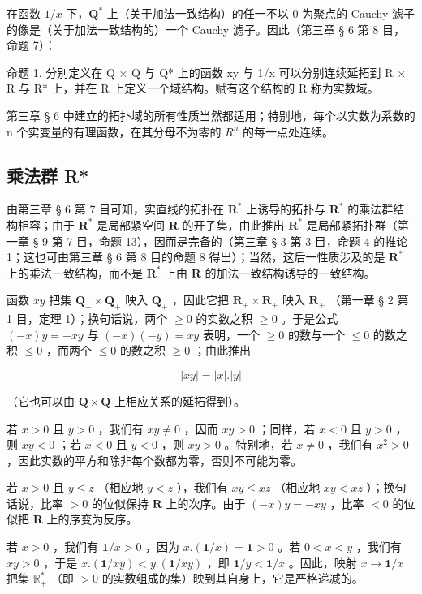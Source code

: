 在函数 \(1 / x\) 下，\(\mathbf{Q}^*\) 上（关于加法一致结构）的任一不以 \(0\) 为聚点的 Cauchy 滤子的像是（关于加法一致结构的）一个 Cauchy 滤子。因此（第三章 § 6 第 8 目，命题 7）：

命题 1. 分别定义在 Q × Q 与 Q* 上的函数 xy 与 1/x 可以分别连续延拓到 R × R 与 R* 上，并在 R 上定义一个域结构。赋有这个结构的 R 称为实数域。

第三章 § 6 中建立的拓扑域的所有性质当然都适用；特别地，每个以实数为系数的 n 个实变量的有理函数，在其分母不为零的 \(R^{n}\) 的每一点处连续。

\subsection{乘法群 R*}

由第三章 § 6 第 7 目可知，实直线的拓扑在 \(\mathbf{R}^*\) 上诱导的拓扑与 \(\mathbf{R}^*\) 的乘法群结构相容；由于 \(\mathbf{R}^*\) 是局部紧空间 \(\mathbf{R}\) 的开子集，由此推出 \(\mathbf{R}^*\) 是局部紧拓扑群（第一章 § 9 第 7 目，命题 13），因而是完备的（第三章 § 3 第 3 目，命题 4 的推论 1；这也可由第三章 § 6 第 8 目的命题 8 得出）；当然，这后一性质涉及的是 \(\mathbf{R}^*\) 上的乘法一致结构，而不是 \(\mathbf{R}^*\) 上由 \(\mathbf{R}\) 的加法一致结构诱导的一致结构。

函数 \(xy\) 把集 \(\mathbf{Q}_{+} \times \mathbf{Q}_{+}\) 映入 \(\mathbf{Q}_{+}\) ，因此它把 \(\mathbf{R}_{+} \times \mathbf{R}_{+}\) 映入 \(\mathbf{R}_{+}\) （第一章 § 2 第 1 目，定理 1）；换句话说，两个 \(\geqslant 0\) 的实数之积 \(\geqslant 0\) 。于是公式 \((-x)y = -xy\) 与 \((-x)(-y) = xy\) 表明，一个 \(\geqslant 0\) 的数与一个 \(\leqslant 0\) 的数之积 \(\leqslant 0\) ，而两个 \(\leqslant 0\) 的数之积 \(\geqslant 0\) ；由此推出

\[
| x y | = | x |. | y |\tag{1}
\]

（它也可以由 \(\mathbf{Q} \times \mathbf{Q}\) 上相应关系的延拓得到）。

若 \(x > 0\) 且 \(y > 0\) ，我们有 \(xy \neq 0\) ，因而 \(xy > 0\) ；同样，若 \(x < 0\) 且 \(y > 0\) ，则 \(xy < 0\) ；若 \(x < 0\) 且 \(y < 0\) ，则 \(xy > 0\) 。特别地，若 \(x \neq 0\) ，我们有 \(x^2 > 0\) ，因此实数的平方和除非每个数都为零，否则不可能为零。

若 \(x > 0\) 且 \(y \leqslant z\) （相应地 \(y < z\) ），我们有 \(xy \leqslant xz\) （相应地 \(xy < xz\) ）；换句话说，比率 \(> 0\) 的位似保持 \(\mathbf{R}\) 上的次序。由于 \((-x)y = -xy\) ，比率 \(< 0\) 的位似把 \(\mathbf{R}\) 上的序变为反序。

若 \(x > 0\) ，我们有 \(\mathbf{1} / x > 0\) ，因为 \(x.(\mathbf{1} / x) = \mathbf{1} > 0\) 。若 \(0 < x < y\) ，我们有 \(xy > 0\) ，于是 \(x.(\mathbf{1} / xy) < y.(\mathbf{1} / xy)\) ，即 \(\mathbf{1} / y < \mathbf{1} / x\) 。因此，映射 \(x \to \mathbf{1} / x\) 把集 \(\mathbb{R}_+^*\) （即 \(> 0\) 的实数组成的集）映到其自身上，它是严格递减的。


